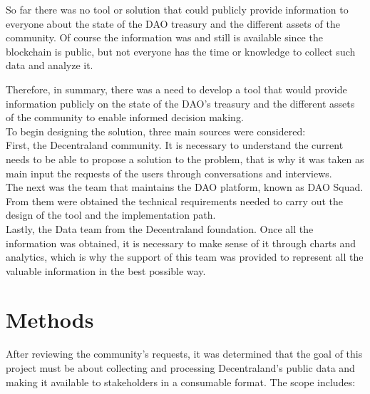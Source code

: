 \documentclass[MSE,Master,english]{twbook}%
\begin{document}
So far there was no tool or solution that could publicly provide information to everyone about the state of the DAO treasury and the different assets of the community. Of course the information was and still is available since the blockchain is public, but not everyone has the time or knowledge to collect such data and analyze it.

Therefore, in summary, there was a need to develop a tool that would provide information publicly on the state of the DAO's treasury and the different assets of the community to enable informed decision making. \\

To begin designing the solution, three main sources were considered: \\

First, the Decentraland community. It is necessary to understand the current needs to be able to propose a solution to the problem, that is why it was taken as main input the requests of the users through conversations and interviews. \\

The next was the team that maintains the DAO platform, known as DAO Squad. From them were obtained the technical requirements needed to carry out the design of the tool and the implementation path. \\

Lastly, the Data team from the Decentraland foundation. Once all the information was obtained, it is necessary to make sense of it through charts and analytics, which is why the support of this team was provided to represent all the valuable information in the best possible way.

\section{Methods\label{methods}}
After reviewing the community's requests, it was determined that the goal of this project must be about collecting and processing Decentraland's public data and making it available to stakeholders in a consumable format. The scope includes:
\end{document}
